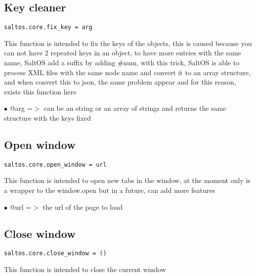 \documentclass[a4paper]{book}
\begin{document}
\hypertarget{toc489}{}
\subsection{Key cleaner}

\begin{lstlisting}
saltos.core.fix_key = arg
\end{lstlisting}

This function is intended to fix the keys of the objects, this is caused because you can not
have 2 repeated keys in an object, to have more entries with the same name, SaltOS add a suffix
by adding \#num, with this trick, SaltOS is able to process XML files with the same node name
and convert it to an array structure, and when convert this to json, the same problem appear and
for this reason, exists this function here

\begin{compactitem}
\item[\color{myblue}$\bullet$] @arg =$>$ can be an string or an array of strings and returns the same structure with the keys fixed
\end{compactitem}

\hypertarget{toc490}{}
\subsection{Open window}

\begin{lstlisting}
saltos.core.open_window = url
\end{lstlisting}

This function is intended to open new tabs in the window, at the moment only is a wrapper to
the window.open but in a future, can add more features

\begin{compactitem}
\item[\color{myblue}$\bullet$] @url =$>$ the url of the page to load
\end{compactitem}

\hypertarget{toc491}{}
\subsection{Close window}

\begin{lstlisting}
saltos.core.close_window = ()
\end{lstlisting}

This function is intended to close the current window
\end{document}

